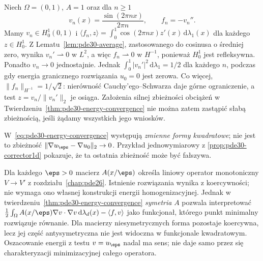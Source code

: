 \begin{kontrprzyklad}
\label{ex:pde30-weak-load}
Niech $\Omega=(0,1)$, $A=1$ oraz dla $n\ge1$
\[
 v_n(x)=\frac{\sin(2\pi nx)}{2\pi n},
 \qquad f_n=-v_n''.
\]
Mamy $v_n\in H_0^1(0,1)$ i
$\langle f_n,z\rangle=\int_0^1\cos(2\pi nx)z'(x)
\,\mathrm d\lambda_1(x)$ dla każdego $z\in H_0^1$.
Z Lematu~\ref{lem:pde30-average}, zastosowanego
do cosinusa o średniej zero, wynika
$v_n'\rightharpoonup0$ w $L^2$, a więc
$f_n\rightharpoonup0$ w $H^{-1}$, ponieważ
$H_0^1$ jest refleksywna.
Ponadto $v_n\to0$ jednostajnie.
Jednak $\int_0^1|v_n'|^2\,\mathrm d\lambda_1=1/2$
dla każdego $n$, podczas gdy energia granicznego
rozwiązania $u_0=0$ jest zerowa.
Co więcej, $\|f_n\|_{H^{-1}}=1/\sqrt2$:
nierówność Cauchy'ego--Schwarza daje górne
ograniczenie, a test $z=v_n/\|v_n'\|_2$
je osiąga. Założenia silnej zbieżności obciążeń
w Twierdzeniu~\ref{thm:pde30-energy-convergence}
nie można zatem zastąpić słabą zbieżnością,
jeśli żądamy wszystkich jego wniosków.
\end{kontrprzyklad}

\begin{uwaga}
W~\eqref{eq:pde30-energy-convergence} występują
\emph{zmienne formy kwadratowe}; nie jest to
zbieżność $\|\nabla u_\eps-\nabla u_0\|_2\to0$.
Przykład jednowymiarowy z
\ref{prop:pde30-corrector1d} pokazuje, że ta ostatnia
zbieżność może być fałszywa.
\end{uwaga}


\begin{uwaga}
\label{rem:pde-v44-homogenization-monotone}
Dla każdego $\eps>0$ macierz $A(x/\eps)$
określa liniowy operator monotoniczny
$V\to V'$ z rozdziału~\ref{chap:pde26}. Istnienie
rozwiązania wynika z koercywności; nie wymaga ono
własnej konstrukcji energii homogenizacyjnej.
Jednak w twierdzeniu~\ref{thm:pde30-energy-convergence}
\emph{symetria} $A$ pozwala interpretować
$\frac12\int_\Omega A(x/\eps)\nabla v\cdot\nabla v\,
\mathrm d\lambda_d(x)-\langle f,v\rangle$ jako funkcjonał,
którego punkt minimalny rozwiązuje równanie. Dla
macierzy niesymetrycznych forma pozostaje koercywna,
lecz jej część antysymetryczna nie jest widoczna
w funkcjonale kwadratowym. Oszacowanie energii z testu
$v=u_\eps$ nadal ma sens; nie daje samo przez się
charakteryzacji minimizacyjnej całego operatora.
\end{uwaga}


